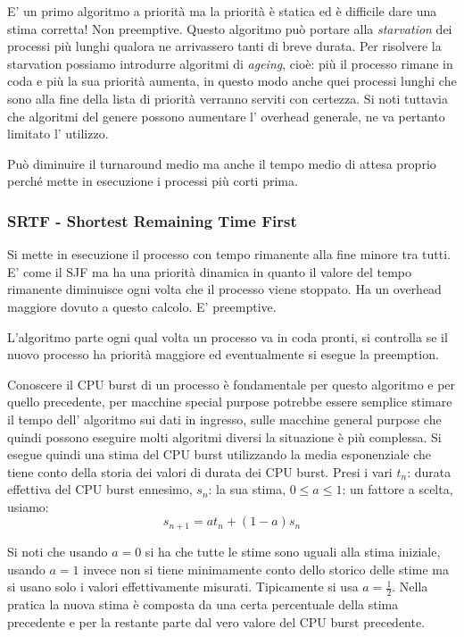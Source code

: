 E' un primo algoritmo a priorità ma la priorità è statica ed è difficile dare una stima corretta!
Non preemptive. Questo algoritmo può portare alla \emph{starvation} dei processi più lunghi qualora ne arrivassero tanti di breve durata.
Per risolvere la starvation possiamo introdurre algoritmi di \emph{ageing}, cioè: più il processo rimane in coda e più la sua priorità aumenta, in questo modo anche quei processi lunghi che sono alla fine della lista di priorità verranno serviti con certezza.
Si noti tuttavia che algoritmi del genere possono aumentare l' overhead generale, ne va pertanto limitato l' utilizzo.

Può diminuire il turnaround medio ma anche il tempo medio di attesa proprio perché mette in esecuzione i processi più corti prima.

\subsubsection{SRTF - Shortest Remaining Time First}
Si mette in esecuzione il processo con tempo rimanente alla fine minore tra tutti. E' come il SJF ma ha una priorità dinamica in quanto il valore del tempo rimanente diminuisce ogni volta che il processo viene stoppato.
Ha un overhead maggiore dovuto a questo calcolo.
E' preemptive.

L'algoritmo parte ogni qual volta un processo va in coda pronti, si controlla se il nuovo processo ha priorità maggiore ed eventualmente si esegue la preemption.

Conoscere il CPU burst di un processo è fondamentale per questo algoritmo e per quello precedente, per macchine special purpose potrebbe essere semplice stimare il tempo dell' algoritmo sui dati in ingresso, sulle macchine general purpose che quindi possono eseguire molti algoritmi diversi la situazione è più complessa.
Si esegue quindi una stima del CPU burst utilizzando la media esponenziale che tiene conto della storia dei valori di durata dei CPU burst. Presi i vari $t_n$: durata effettiva del CPU burst ennesimo, $s_n$: la sua stima, $0 \leq a \leq 1$: un fattore a scelta, usiamo:
$$ s_{n+1} = at_n + (1-a)s_n $$

Si noti che usando $a = 0$ si ha che tutte le stime sono uguali alla stima iniziale, usando $a = 1$ invece non si tiene minimamente conto dello storico delle stime ma si usano solo i valori effettivamente misurati.
Tipicamente si usa $a = \frac{1}{2}$.
Nella pratica la nuova stima è composta da una certa percentuale della stima precedente e per la restante parte dal vero valore del CPU burst precedente.

